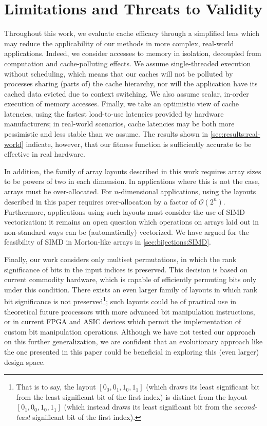 \section{Limitations and Threats to Validity}

\label{sec:threats}

Throughout this work, we evaluate cache efficacy through a simplified lens which may reduce the applicability of our methods in more complex, real-world applications. Indeed, we consider accesses to memory in isolation, decoupled from computation and cache-polluting effects. We assume single-threaded execution without scheduling, which means that our caches will not be polluted by processes sharing (parts of) the cache hierarchy, nor will the application have its cached data evicted due to context switching. We also assume scalar, in-order execution of memory accesses. Finally, we take an optimistic view of cache latencies, using the fastest load-to-use latencies provided by hardware manufacturers; in real-world scenarios, cache latencies may be both more pessimistic and less stable than we assume. The results shown in \cref{sec:results:real-world} indicate, however, that our fitness function is sufficiently accurate to be effective in real hardware. %

In addition, the family of array layouts described in this work requires array sizes to be powers of two in each dimension. In applications where this is not the case, arrays must be over-allocated. For $n$-dimensional applications, using the layouts described in this paper requires over-allocation by a factor of $\mathcal{O}(2^n)$. Furthermore, applications using such layouts must consider the use of SIMD vectorization: it remains an open question which operations on arrays laid out in non-standard ways can be (automatically) vectorized. We have argued for the feasibility of SIMD in Morton-like arrays in \cref{sec:bijections:SIMD}.

Finally, our work considers only multiset permutations, in which the rank significance of bits in the input indices is preserved. This decision is based on current commodity hardware, which is capable of efficiently permuting bits only under this condition. There exists an even larger family of layouts in which rank bit significance is not preserved\footnote{That is to say, the layout $[0_0, 0_1, 1_0, 1_1]$ (which draws its least significant bit from the least significant bit of the first index) is distinct from the layout $[0_1, 0_0, 1_0, 1_1]$ (which instead draws its least significant bit from the \emph{second-least} significant bit of the first index).}; such layouts could be of practical use in theoretical future processors with more advanced bit manipulation instructions, or in current FPGA and ASIC devices which permit the implementation of custom bit manipulation operations. Although we have not tested our approach on this further generalization, we are confident that an evolutionary approach like the one presented in this paper could be beneficial in exploring this (even larger) design space.
